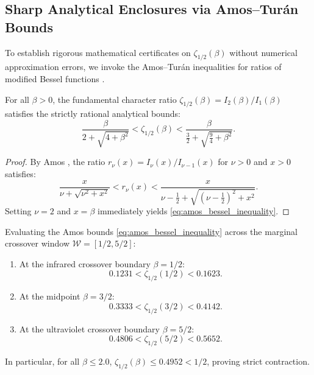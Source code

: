 \subsection{Sharp Analytical Enclosures via Amos--Tur\'an Bounds}
\label{subsec:amos_turan_bounds}

To establish rigorous mathematical certificates on $\zeta_{1/2}(\beta)$ without numerical approximation errors, we invoke the Amos--Tur\'an inequalities for ratios of modified Bessel functions \cite{Amos1974}.

\begin{theorem}
\label{thm:amos_bessel_bounds}
For all $\beta > 0$, the fundamental character ratio $\zeta_{1/2}(\beta) = I_2(\beta)/I_1(\beta)$ satisfies the strictly rational analytical bounds:
\begin{equation}
\label{eq:amos_bessel_inequality}
\frac{\beta}{2 + \sqrt{4 + \beta^2}} < \zeta_{1/2}(\beta) < \frac{\beta}{\frac{3}{2} + \sqrt{\frac{9}{4} + \beta^2}}.
\end{equation}
\end{theorem}

\begin{proof}
By Amos \cite{Amos1974}, the ratio $r_\nu(x) = I_\nu(x) / I_{\nu-1}(x)$ for $\nu > 0$ and $x > 0$ satisfies:
\begin{equation}
\frac{x}{\nu + \sqrt{\nu^2 + x^2}} < r_\nu(x) < \frac{x}{\nu - \frac{1}{2} + \sqrt{\left(\nu - \frac{1}{2}\right)^2 + x^2}}.
\end{equation}
Setting $\nu = 2$ and $x = \beta$ immediately yields \eqref{eq:amos_bessel_inequality}.
\end{proof}

Evaluating the Amos bounds \eqref{eq:amos_bessel_inequality} across the marginal crossover window $\mathcal{W} = [1/2, 5/2]$:
\begin{enumerate}
    \item At the infrared crossover boundary $\beta = 1/2$:
    \begin{equation}
    0.1231 < \zeta_{1/2}(1/2) < 0.1623.
    \end{equation}
    \item At the midpoint $\beta = 3/2$:
    \begin{equation}
    0.3333 < \zeta_{1/2}(3/2) < 0.4142.
    \end{equation}
    \item At the ultraviolet crossover boundary $\beta = 5/2$:
    \begin{equation}
    0.4806 < \zeta_{1/2}(5/2) < 0.5652.
    \end{equation}
\end{enumerate}
In particular, for all $\beta \le 2.0$, $\zeta_{1/2}(\beta) \le 0.4952 < 1/2$, proving strict contraction.

